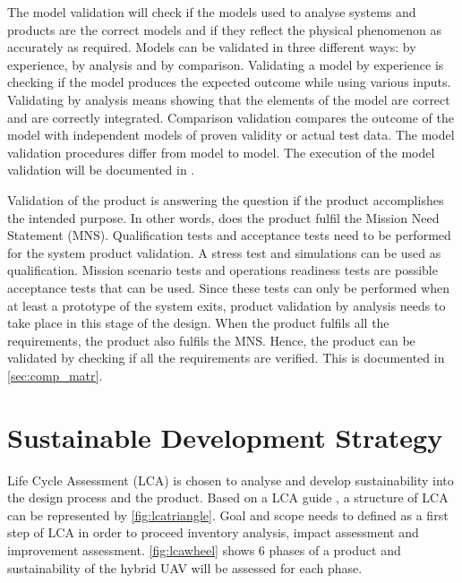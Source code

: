 
The model validation will check if the models used to analyse systems and products are the correct models and if they reflect the physical phenomenon as accurately as required. Models can be validated in three different ways: by experience, by analysis and by comparison. Validating a model by experience is checking if the model produces the expected outcome while using various inputs. Validating by analysis means showing that the elements of the model are correct and are correctly integrated. Comparison validation compares the outcome of the model with independent models of proven validity or actual test data. The model validation procedures differ from model to model. The execution of the model validation will be documented in . 

Validation of the product is answering the question if the product accomplishes the intended purpose. In other words, does the product fulfil the Mission Need Statement (MNS). Qualification tests and acceptance tests need to be performed for the system product validation. A stress test and simulations can be used as qualification. Mission scenario tests and operations readiness tests are possible acceptance tests that can be used. Since these tests can only be performed when at least a prototype of the system exits, product validation by analysis needs to take place in this stage of the design. When the product fulfils all the requirements, the product also fulfils the MNS. Hence, the product can be validated by checking if all the requirements are verified. This is documented in \autoref{sec:comp_matr}.

\section{Sustainable Development Strategy}
\label{sec:sust_deve_stra}

Life Cycle Assessment (LCA) is chosen to analyse and develop sustainability into the design process and the product. Based on a LCA guide \cite{lca}, a structure of LCA can be represented by \autoref{fig:lcatriangle}. Goal and scope needs to defined as a first step of LCA in order to proceed inventory analysis, impact assessment and improvement assessment. \autoref{fig:lcawheel} shows 6 phases of a product and sustainability of the hybrid UAV will be assessed for each phase.

